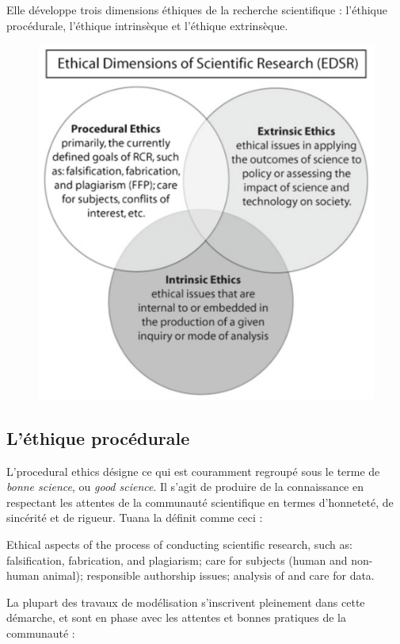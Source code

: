 Elle développe trois dimensions éthiques de la recherche scientifique : l'éthique procédurale, l'éthique intrinsèque et l'éthique extrinsèque. 

\begin{figure}
    \centering

    \includegraphics[width=0.6\linewidth]{venn_ethics.png}
    \label{fig:diag-venn}
\end{figure}


\subsection{L'éthique procédurale}

L'\Gls{procedural ethics} désigne ce qui est couramment regroupé sous le terme de \textit{bonne science}, ou \textit{good science}. Il s'agit de produire de la connaissance en respectant les attentes de la communauté scientifique en termes d'honneteté, de sincérité et de rigueur. Tuana \cite{tuana_leading_2010}  la définit comme ceci : 

\begin{displayquote}
Ethical aspects of the process of conducting scientific research, such as: falsification, fabrication, and plagiarism; care for subjects (human and non-human animal); responsible authorship issues; analysis of and care for data.
\end{displayquote}
La plupart des travaux de modélisation s'inscrivent pleinement dans cette démarche, et sont en phase avec les attentes et bonnes pratiques de la communauté : 


